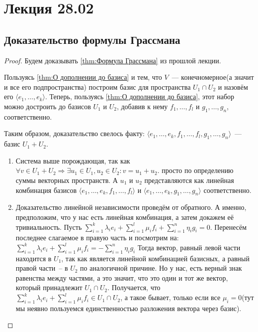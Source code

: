 \section{Лекция 28.02}\label{3}
\subsection{Доказательство формулы Грассмана}
\begin{proof}
    Будем доказывать \ref{thm:Формула Грассмана} из прошлой лекции.

    Пользуясь \ref{thm:О дополнении до базиса} и тем, что $V$~--- конечномерное(а значит и все его подпространства)
    построим базис для пространства $U_1\cap U_2$ и назовём его $\langle e_1,\dots, e_k\rangle$. 
    Теперь, пользуясь \ref{thm:О дополнении до базиса}, этот набор можно достроить до базисов $U_1$ и $U_2$,
    добавив к нему $f_1,\dots,f_l$ и $g_1,\dots,g_n$, соответственно.

    Таким образом, доказательство свелось факту: $\langle e_1,\dots,e_k,f_1,\dots,f_l,g_1,\dots,g_n\rangle$~---
    базис $U_1+U_2$.
    \begin{enumerate}
        \item Система выше порождающая, так как 
            $\forall v\in U_1 + U_2 \Rightarrow \exists u_1\in U_1, u_2\in U_2\colon v = u_1+u_2$.
            просто по определению суммы векторных пространств. А $u_1$ и $u_2$ представляются как линейная
            комбинация базисов 
            $\langle e_1,\dots,e_k,f_1,\dots,f_l\rangle$ и $\langle e_1,\dots,e_k,g_1,\dots,g_n\rangle$
            соответственно.
        \item
            Доказательство линейной независимости проведём от обратного.
            А именно, предположим, что у нас есть линейная комбинация, а затем докажем её тривиальность.
            Пусть $\sum\limits_{i=1}^{k}\lambda_ie_i +
                   \sum\limits_{i=1}^{l}\mu_if_i + 
                   \sum\limits_{i=1}^{n}\eta_ig_i = 0$.
            Перенесём последнее слагаемое в правую часть и посмотрим на:
                $\sum\limits_{i=1}^{k}\lambda_ie_i +
                 \sum\limits_{i=1}^{l}\mu_if_i = 
                -\sum\limits_{i=1}^{n}\eta_ig_i$
            Тогда вектор, равный левой части находится в $U_1$, так как является линейной комбинацией
            базисных, а равный правой части~-- в $U_2$ по аналогичной причине. Но у нас, есть верный знак
            равенства между частями, а это значит, что это один и тот же вектор, который принадлежит $U_1\cap U_2$.
            Получается, что $\sum\limits_{i=1}^{k}\lambda_ie_i + \sum\limits_{i=1}^{l}\mu_if_i \in U_1\cap U_2$,
            а такое бывает, только если все $\mu_i = 0$(тут мы неявно пользуемся единственностью разложения
            вектора через базис).


\end{enumerate}
\end{proof}
